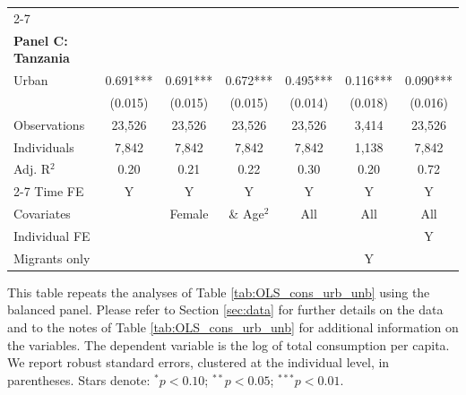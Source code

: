 \begin{table}[htbp]
\begin{threeparttable}
\begin{tabular}{l cccccc}
\cmidrule{2-7}
                    &               &               &               &               &               &               \\
\textbf{Panel C: Tanzania} \\
Urban               &       0.691***&       0.691***&       0.672***&       0.495***&       0.116***&       0.090***\\
                    &     (0.015)   &     (0.015)   &     (0.015)   &     (0.014)   &     (0.018)   &     (0.016)   \\
\addlinespace
Observations        &      23,526   &      23,526   &      23,526   &      23,526   &       3,414   &      23,526   \\
Individuals         &       7,842   &       7,842   &       7,842   &       7,842   &       1,138   &       7,842   \\
Adj. R$^{2}$        &        0.20   &        0.21   &        0.22   &        0.30   &        0.20   &        0.72   \\
\cmidrule{2-7} Time FE & Y & Y & Y & Y & Y & Y \\ Covariates & & Female & \& Age$^2$ & All & All & All \\ Individual FE & & & & & & Y \\ Migrants only & & & & & Y & \\ \bottomrule \end{tabular} \begin{tablenotes}[flushleft] \footnotesize \item{This table repeats the analyses of Table \ref{tab:OLS_cons_urb_unb}  using the balanced panel. Please refer to Section \ref{sec:data} for further details on the data and to the notes of Table \ref{tab:OLS_cons_urb_unb} for additional information on the variables. The dependent variable is the log of total consumption per capita. We report robust standard errors, clustered at the individual level, in parentheses. Stars denote: $^{*} p<0.10$; $^{**} p<0.05$; $^{***} p<0.01$.} \end{tablenotes} \end{threeparttable} \end{table}
